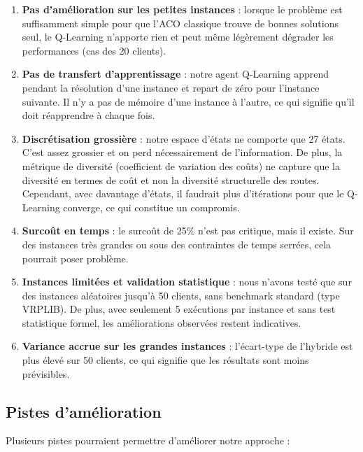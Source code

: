 \documentclass[12pt, a4paper]{article}
\begin{document}
\begin{enumerate}
    \item \textbf{Pas d'amélioration sur les petites instances} : lorsque le problème est suffisamment simple pour que l'ACO classique trouve de bonnes solutions seul, le Q-Learning n'apporte rien et peut même légèrement dégrader les performances (cas des 20 clients).

    \item \textbf{Pas de transfert d'apprentissage} : notre agent Q-Learning apprend pendant la résolution d'une instance et repart de zéro pour l'instance suivante. Il n'y a pas de mémoire d'une instance à l'autre, ce qui signifie qu'il doit réapprendre à chaque fois.

    \item \textbf{Discrétisation grossière} : notre espace d'états ne comporte que 27 états. C'est assez grossier et on perd nécessairement de l'information. De plus, la métrique de diversité (coefficient de variation des coûts) ne capture que la diversité en termes de coût et non la diversité structurelle des routes. Cependant, avec davantage d'états, il faudrait plus d'itérations pour que le Q-Learning converge, ce qui constitue un compromis.

    \item \textbf{Surcoût en temps} : le surcoût de 25\% n'est pas critique, mais il existe. Sur des instances très grandes ou sous des contraintes de temps serrées, cela pourrait poser problème.

    \item \textbf{Instances limitées et validation statistique} : nous n'avons testé que sur des instances aléatoires jusqu'à 50 clients, sans benchmark standard (type VRPLIB). De plus, avec seulement 5 exécutions par instance et sans test statistique formel, les améliorations observées restent indicatives.

    \item \textbf{Variance accrue sur les grandes instances} : l'écart-type de l'hybride est plus élevé sur 50 clients, ce qui signifie que les résultats sont moins prévisibles.
\end{enumerate}

\subsection{Pistes d'amélioration}

Plusieurs pistes pourraient permettre d'améliorer notre approche :
\end{document}
